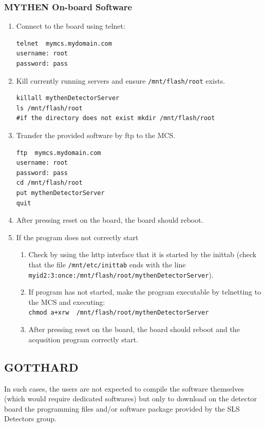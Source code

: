 \documentclass{article}
\begin{document}
\subsubsection{MYTHEN On-board Software}
\begin{enumerate}
 \item Connect to the board using telnet:
\begin{verbatim}
telnet  mymcs.mydomain.com
username: root
password: pass
\end{verbatim}
 \item Kill currently running servers and ensure \verb=/mnt/flash/root= exists.
\begin{verbatim}
killall mythenDetectorServer
ls /mnt/flash/root
#if the directory does not exist mkdir /mnt/flash/root
\end{verbatim}
 \item Transfer the provided software by ftp to the MCS.
\begin{verbatim}
ftp  mymcs.mydomain.com
username: root
password: pass
cd /mnt/flash/root
put mythenDetectorServer
quit
\end{verbatim}

\item After pressing reset on the board, the board should reboot.

\item If the program does not correctly start
 \begin{enumerate}
  \item Check by using the http interface that it is started by the inittab
(check that the file \verb=/mnt/etc/inittab= ends with the line \\
\verb=myid2:3:once:/mnt/flash/root/mythenDetectorServer=).  
  \item If program has not started, make the program executable by telnetting to
the MCS and executing: \\
\verb=chmod a+xrw  /mnt/flash/root/mythenDetectorServer=
  \item After pressing reset on the board, the board should reboot and the
acqusition program correctly start.
 \end{enumerate}
\end{enumerate}




\subsection{GOTTHARD}

In such cases, the users are not expected to compile the software
themselves (which would require dedicated softwares) but only to download on the
detector board the programming files and/or software package provided by
the SLS Detectors group.
\end{document}
